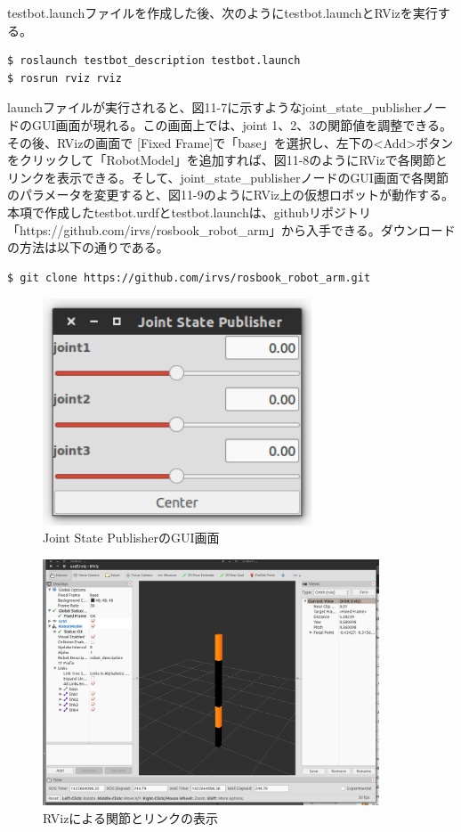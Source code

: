 testbot.launchファイルを作成した後、次のようにtestbot.launchとRVizを実行する。

\begin{lstlisting}[language=ROS]
$ roslaunch testbot_description testbot.launch
$ rosrun rviz rviz
\end{lstlisting}

launchファイルが実行されると、図11-7に示すようなjoint\_state\_publisherノードのGUI画面が現れる。この画面上では、joint 1、2、3の関節値を調整できる。その後、RVizの画面で [Fixed Frame]で「base」を選択し、左下の<Add>ボタンをクリックして「RobotModel」を追加すれば、図11-8のようにRVizで各関節とリンクを表示できる。そして、joint\_state\_publisherノードのGUI画面で各関節のパラメータを変更すると、図11-9のようにRViz上の仮想ロボットが動作する。
本項で作成したtestbot.urdfとtestbot.launchは、githubリポジトリ「https://github.com/irvs/rosbook\_robot\_arm」から入手できる。ダウンロードの方法は以下の通りである。

\begin{lstlisting}[language=ROS]
$ git clone https://github.com/irvs/rosbook_robot_arm.git
\end{lstlisting}

\begin{figure}[htp]
  \centering
  \includegraphics[width=8cm]{pictures/chapter11/pic_11_07.png}
  \caption{Joint State PublisherのGUI画面}
\end{figure}

\begin{figure}[htp]
  \centering
  \includegraphics[width=10cm]{pictures/chapter11/pic_11_08.png}
  \caption{RVizによる関節とリンクの表示}
\end{figure}

